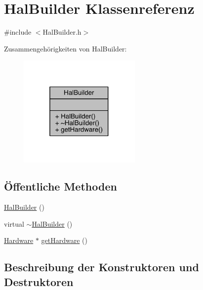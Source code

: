 \hypertarget{class_hal_builder}{}\section{Hal\+Builder Klassenreferenz}
\label{class_hal_builder}


{\ttfamily \#include $<$Hal\+Builder.\+h$>$}



Zusammengehörigkeiten von Hal\+Builder\+:\nopagebreak
\begin{figure}[H]
\begin{center}
\leavevmode
\includegraphics[width=169pt]{class_hal_builder__coll__graph}
\end{center}
\end{figure}
\subsection*{Öffentliche Methoden}
\begin{DoxyCompactItemize}
\item 
\hyperlink{class_hal_builder_a722e3025d6c9659efcc011df559d0619}{Hal\+Builder} ()
\item 
virtual \hyperlink{class_hal_builder_af77e28e213c8aa028b18cf435e9ef3c8}{$\sim$\+Hal\+Builder} ()
\item 
\hyperlink{class_hardware}{Hardware} $\ast$ \hyperlink{class_hal_builder_addc8f400dfa9dee3f0d9de116512212f}{get\+Hardware} ()
\end{DoxyCompactItemize}


\subsection{Beschreibung der Konstruktoren und Destruktoren}
\hypertarget{class_hal_builder_a722e3025d6c9659efcc011df559d0619}{}\label{class_hal_builder_a722e3025d6c9659efcc011df559d0619} 
